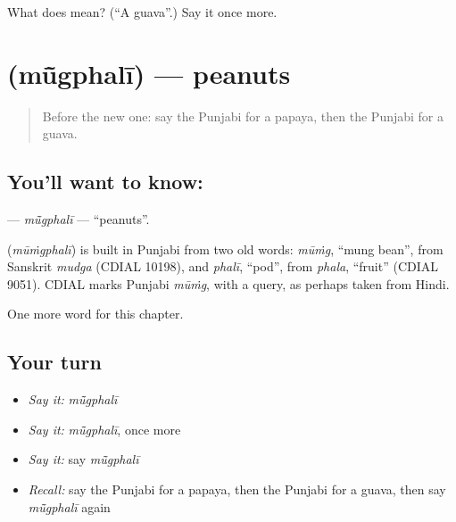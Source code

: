 \begin{tcolorbox}[breakable,colback=teal!4,colframe=teal!35!black,title={Before you move on}]
What does  mean? (\textquotedblleft{}A guava\textquotedblright{}.) Say it once more.
\end{tcolorbox}
\section[\texorpdfstring{\pa{ਮੂੰਗਫਲੀ} (mū̃gphalī)}{ਮੂੰਗਫਲੀ (mū̃gphalī)}]{ (mū̃gphalī) — peanuts}

\label{lesson:PA-C124-mugphali}



\begin{quote}
Before the new one: say the Punjabi for a papaya, then the Punjabi for a guava.
\end{quote}

\subsection*{You'll want to know: }
\textbf{} — \emph{mū̃gphalī} — \textquotedblleft{}peanuts\textquotedblright{}.

\begin{cousinweb}
\textbf{} (\emph{mūṁgphalī}) is built in Punjabi from two old words: \emph{mūṁg}, \textquotedblleft{}mung bean\textquotedblright{}, from Sanskrit \emph{mudga} (CDIAL 10198), and \emph{phalī}, \textquotedblleft{}pod\textquotedblright{}, from \emph{phala}, \textquotedblleft{}fruit\textquotedblright{} (CDIAL 9051). CDIAL marks Punjabi \emph{mūṁg}, with a query, as perhaps taken from Hindi.
\end{cousinweb}

\begin{grammarlens}[title={What you've built}]
One more word for this chapter.
\end{grammarlens}

\subsection*{Your turn}
\begin{itemize}
\raggedright
  \item \emph{Say it:} \emph{mū̃gphalī}
  \item \emph{Say it:} \emph{mū̃gphalī}, once more
  \item \emph{Say it:} say \emph{mū̃gphalī}
  \item \emph{Recall:} say the Punjabi for a papaya, then the Punjabi for a guava, then say \emph{mū̃gphalī} again
\end{itemize}

